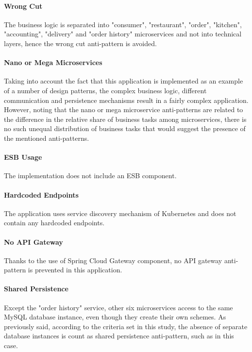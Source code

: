 \documentclass{Configuration_Files/PoliMi3i_thesis}
\begin{document}
\paragraph{Wrong Cut} The business logic is separated into "consumer", "restaurant", "order", "kitchen", "accounting", "delivery" and "order history" microservices and not into technical layers, hence the wrong cut anti-pattern is avoided.

\paragraph{Nano or Mega Microservices} Taking into account the fact that this application is implemented as an example of a number of design patterns, the complex business logic, different communication and persistence mechanisms result in a fairly complex application.
However, noting that the nano or mega microservice anti-patterns are related to the difference in the relative share of business tasks among microservices, there is no such unequal distribution of business tasks that would suggest the presence of the mentioned anti-patterns.

\paragraph{ESB Usage} The implementation does not include an ESB component.

\paragraph{Hardcoded Endpoints} The application uses service discovery mechanism of Kubernetes and does not contain any hardcoded endpoints.

\paragraph{No API Gateway} Thanks to the use of Spring Cloud Gateway component, no API gateway anti-pattern is prevented in this application.

\paragraph{Shared Persistence} Except the "order history" service, other six microservices access to the same MySQL database instance, even though they create their own schemes.
As previously said, according to the criteria set in this study, the absence of separate database instances is count as shared persistence anti-pattern, such as in this case.
\end{document}
